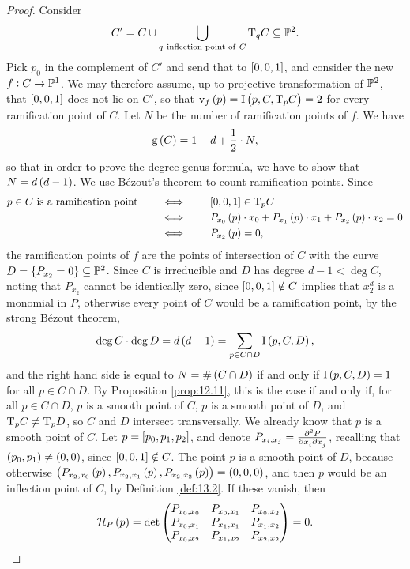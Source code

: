 \begin{proof}
Consider
$$ C' = C \cup \bigcup_{q \ \text{inflection point of} \ C} \mathrm{T}_q C \subseteq \mathbb{P}^2. $$
Pick $ p_0 $ in the complement of $ C' $ and send that to $ \sbr{0, 0, 1} $, and consider the new $ f : C \to \mathbb{P}^1 $. We may therefore assume, up to projective transformation of $ \mathbb{P}^2 $, that $ \sbr{0, 0, 1} $ does not lie on $ C' $, so that $ \v_f\br{p} = \I\br{p, C, \T_p C} = 2 $ for every ramification point of $ C $. Let $ N $ be the number of ramification points of $ f $. We have
$$ \g\br{C} = 1 - d + \dfrac{1}{2} \cdot N, $$
so that in order to prove the degree-genus formula, we have to show that $ N = d\br{d - 1} $. We use B\'ezout's theorem to count ramification points. Since
\begin{align*}
p \in C \ \text{is a ramification point} \qquad
& \iff \qquad \sbr{0, 0, 1} \in \T_p C \\
& \iff \qquad P_{x_0}\br{p} \cdot x_0 + P_{x_1}\br{p} \cdot x_1 + P_{x_2}\br{p} \cdot x_2 = 0 \\
& \iff \qquad P_{x_2}\br{p} = 0,
\end{align*}
the ramification points of $ f $ are the points of intersection of $ C $ with the curve $ D = \cbr{P_{x_2} = 0} \subseteq \PP^2 $. Since $ C $ is irreducible and $ D $ has degree $ d - 1 < \deg C $, noting that $ P_{x_2} $ cannot be identically zero, since $ \sbr{0, 0, 1} \notin C $ implies that $ x_2^d $ is a monomial in $ P $, otherwise every point of $ C $ would be a ramification point, by the strong B\'ezout theorem,
$$ \deg C \cdot \deg D = d\br{d - 1} = \sum_{p \in C \cap D} \I\br{p, C, D}, $$
and the right hand side is equal to $ N = \#\br{C \cap D} $ if and only if $ \I\br{p, C, D} = 1 $ for all $ p \in C \cap D $. By Proposition \ref{prop:12.11}, this is the case if and only if, for all $ p \in C \cap D $, $ p $ is a smooth point of $ C $, $ p $ is a smooth point of $ D $, and $ \mathrm{T}_p C \ne \mathrm{T}_p D $, so $ C $ and $ D $ intersect transversally. We already know that $ p $ is a smooth point of $ C $. Let $ p = \sbr{p_0, p_1, p_2} $, and denote $ P_{x_i, x_j} = \tmd{P}{2}{x_i}{}{x_j}{} $, recalling that $ \br{p_0, p_1} \ne \br{0, 0} $, since $ \sbr{0, 0, 1} \notin C $. The point $ p $ is a smooth point of $ D $, because otherwise $ \br{P_{x_2, x_0}\br{p}, P_{x_2, x_1}\br{p}, P_{x_2, x_2}\br{p}} = \br{0, 0, 0} $, and then $ p $ would be an inflection point of $ C $, by Definition \ref{def:13.2}. If these vanish, then
$$ \HHH_P\br{p} = \det \threebythree{P_{x_0, x_0}}{P_{x_0, x_1}}{P_{x_0, x_2}}{P_{x_0, x_1}}{P_{x_1, x_1}}{P_{x_1, x_2}}{P_{x_0, x_2}}{P_{x_1, x_2}}{P_{x_2, x_2}} = 0. $$

\end{proof}
